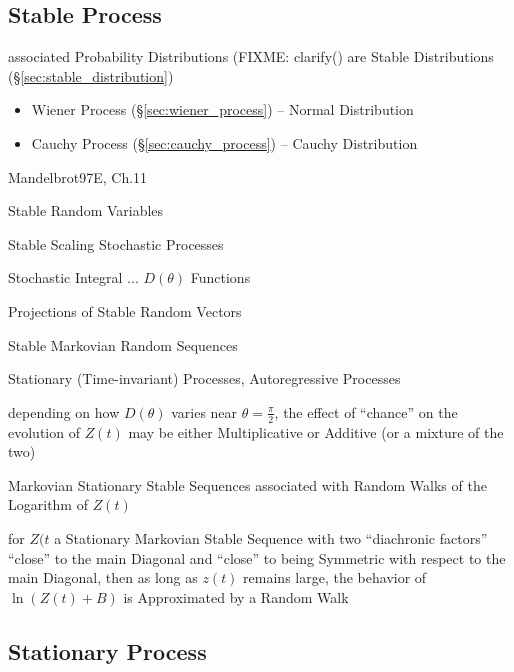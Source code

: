 \subsection{Stable Process}\label{sec:stable_process}

associated Probability Distributions (FIXME: clarify() are Stable Distributions
(\S\ref{sec:stable_distribution})

\begin{itemize}
  \item Wiener Process (\S\ref{sec:wiener_process}) -- Normal Distribution
  \item Cauchy Process (\S\ref{sec:cauchy_process}) -- Cauchy Distribution
\end{itemize}

Mandelbrot97E, Ch.11

Stable Random Variables

Stable Scaling Stochastic Processes

Stochastic Integral ... $D(\theta)$ Functions

Projections of Stable Random Vectors

Stable Markovian Random Sequences

Stationary (Time-invariant) Processes, Autoregressive Processes

depending on how $D(\theta)$ varies near $\theta = \frac{\pi}{2}$, the effect of
``chance'' on the evolution of $Z(t)$ may be either Multiplicative or Additive
(or a mixture of the two)

Markovian Stationary Stable Sequences associated with Random Walks of the
Logarithm of $Z(t)$

for $Z(t$ a Stationary Markovian Stable Sequence with two ``diachronic factors''
``close'' to the main Diagonal and ``close'' to being Symmetric with respect to
the main Diagonal, then as long as $z(t)$ remains large, the behavior of
$\ln(Z(t) + B)$ is Approximated by a Random Walk



\subsection{Stationary Process}\label{sec:stationary_process}

